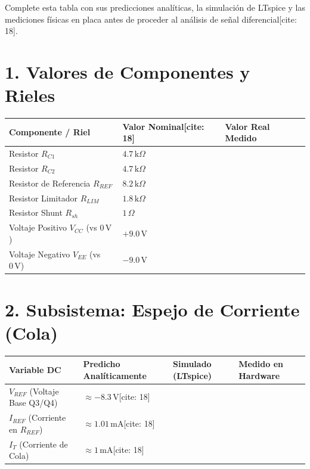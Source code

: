 \documentclass[11pt, a4paper]{article}
\begin{document}
\begin{tcolorbox}[colback=ucbblue!5, colframe=ucbblue, title=\textbf{Registro de Mediciones Estáticas (DC) — Par Diferencial}]
    Complete esta tabla con sus predicciones analíticas, la simulación de LTspice y las mediciones físicas en placa antes de proceder al análisis de señal diferencial[cite: 18].
\end{tcolorbox}

\section*{1. Valores de Componentes y Rieles}
\renewcommand{\arraystretch}{1.6}
\begin{tabularx}{\textwidth}{|>{\raggedright\arraybackslash}X|>{\centering\arraybackslash}X|>{\centering\arraybackslash}X|}
\hline
\rowcolor{ucbblue!20}
\textbf{Componente / Riel} & \textbf{Valor Nominal[cite: 18]} & \textbf{Valor Real Medido} \\ \hline
Resistor $R_{C1}$ & $4.7\,\text{k}\Omega$ & \\ \hline
Resistor $R_{C2}$ & $4.7\,\text{k}\Omega$ & \\ \hline
Resistor de Referencia $R_{REF}$ & $8.2\,\text{k}\Omega$ & \\ \hline
Resistor Limitador $R_{LIM}$ & $1.8\,\text{k}\Omega$ & \\ \hline
Resistor Shunt $R_{sh}$ & $1\,\Omega$ & \\ \hline
Voltaje Positivo $V_{CC}$ (vs $0\,\text{V}$) & $+9.0\,\text{V}$ & \\ \hline
Voltaje Negativo $V_{EE}$ (vs $0\,\text{V}$) & $-9.0\,\text{V}$ & \\ \hline
\end{tabularx}

\section*{2. Subsistema: Espejo de Corriente (Cola)}
\begin{tabularx}{\textwidth}{|>{\raggedright\arraybackslash}p{4.5cm}|>{\centering\arraybackslash}X|>{\centering\arraybackslash}X|>{\centering\arraybackslash}X|}
\hline
\rowcolor{ucbblue!20}
\textbf{Variable DC} & \textbf{Predicho Analíticamente} & \textbf{Simulado (LTspice)} & \textbf{Medido en Hardware} \\ \hline
$V_{REF}$ (Voltaje Base Q3/Q4) & $\approx -8.3\,\text{V}$[cite: 18] & & \\ \hline
$I_{REF}$ (Corriente en $R_{REF}$) & $\approx 1.01\,\text{mA}$[cite: 18] & & \\ \hline
$I_T$ (Corriente de Cola) & $\approx 1\,\text{mA}$[cite: 18] & & \\ \hline
\end{tabularx}
\end{document}
